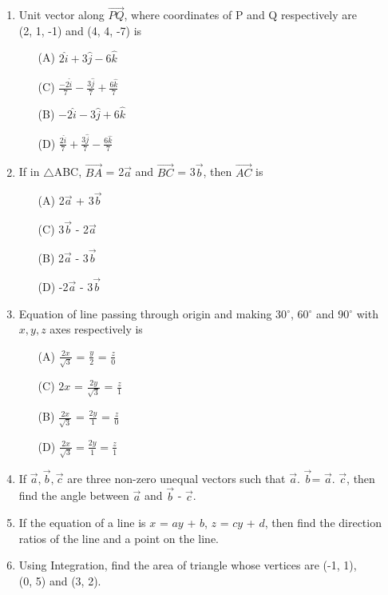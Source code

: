 \documentclass{article}
\begin{document}
\begin{enumerate}
	\item  Unit vector along $ \overrightarrow{PQ} $, where coordinates of P and Q respectively are\\ (2, 1, -1) and (4, 4, -7) is
		\begin{multicols}{2}
			\begin{enumerate}
				\item[(A)] $ 2\hat{i}+3\hat{j}-6\hat{k} $
				\item[(C)] $ \frac{-2\hat{i}}{7}-\frac{3\hat{j}}{7}+\frac{6\hat{k}}{7} $	
				\item[(B)] $ -2\hat{i}-3\hat{j}+6\hat{k} $
				\item[(D)] $ \frac{2\hat{i}}{7}+\frac{3\hat{j}}{7}-\frac{6\hat{k}}{7} $
			\end{enumerate}
		\end{multicols}
	\item If in $ \triangle $ABC, $\overrightarrow{BA}$ = 2$ \vec{a} $ and $ \overrightarrow{BC} $ = 3$ \vec{b} $, then $ \overrightarrow{AC} $ is
		\begin{multicols}{2}
		\begin{enumerate}
			\item[(A)] 2$\vec{a}$ + 3$\vec{b}$
			\item[(C)] 3$\vec{b}$ - 2$\vec{a}$
			\item[(B)] 2$\vec{a}$ - 3$\vec{b}$
			\item[(D)] -2$\vec{a}$ - 3$\vec{b}$
		\end{enumerate}
		\end{multicols}
	\item Equation of line passing through origin and making 30$ ^{\circ} $, 60$ ^{\circ} $ and 90$ ^{\circ} $ with\\$x, y, z$ axes respectively is
		\begin{multicols}{2}
			\begin{enumerate}
				\item[(A)] $ \frac{2x}{\sqrt{3}} $ = $ \frac{y}{2} $ = $ \frac{z}{0} $
				\item[(C)] $ 2x $ = $ \frac{2y}{\sqrt{3}} $ = $ \frac{z}{1} $
				\item[(B)] $ \frac{2x}{\sqrt{3}} $ = $ \frac{2y}{1} $ = $ \frac{z}{0} $
				\item[(D)] $ \frac{2x}{\sqrt{3}} = \frac{2y}{1} = \frac{z}{1} $
			\end{enumerate}
		\end{multicols}
	\item If $ \vec{a}, \vec{b}, \vec{c} $ are three non-zero unequal vectors such that $ \vec{a}. $ $ \vec{b} $= $ \vec{a}. $ $ \vec{c} $, then\\find the angle between $ \vec{a} $ and $ \vec{b} $ - $ \vec{c} $.
	\item If the equation of a line is $ x $ = $ ay $ + $ b $, $ z $ = $ cy $ + $ d $, then find the direction\\ratios of the line and a point on the line.
	\item Using Integration, find the area of triangle whose vertices are (-1, 1),\\(0, 5) and (3, 2).
\end{enumerate}
\end{document}
